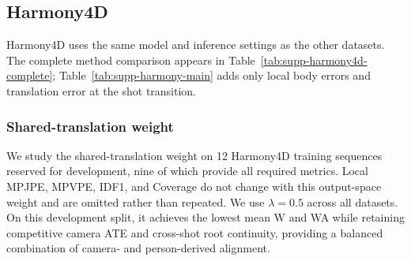 \FloatBarrier
\subsection{Harmony4D}
\label{app:harmony-details}

Harmony4D uses the same model and inference settings as the other datasets.
The complete method comparison appears in
Table~\ref{tab:supp-harmony4d-complete}; Table~\ref{tab:supp-harmony-main}
adds only local body errors and translation error at the shot transition.

\begin{table}[t]
  \centering
  \caption{Additional diagnostics on 88 Harmony4D clips. Local body errors
  are in mm and transition-translation error is in m.}
  \label{tab:supp-harmony-main}
  \supptablesize
  
\end{table}

\subsubsection{Shared-translation weight}
\label{app:harmony-lambda-sensitivity}

We study the shared-translation weight on 12 Harmony4D training sequences
reserved for development, nine of which provide all required metrics. Local
MPJPE, MPVPE, IDF1, and Coverage do not change with this output-space weight
and are omitted rather than repeated. We use $\lambda=0.5$ across all
datasets. On this development split, it achieves the lowest mean W and WA
while retaining competitive camera ATE and cross-shot root continuity,
providing a balanced combination of camera- and person-derived alignment.

\begin{table}[t]
  \centering
  \caption{Sensitivity to the shared-translation weight on the Harmony4D
  development split. W/WA are in mm; ATE and cross-shot root error are in m.}
  \label{tab:harmony-lambda-sensitivity}
  \supptablesize
  
\end{table}

